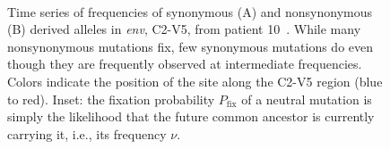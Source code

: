 \documentclass[rmp, twocolumn]{revtex4}
\newcommand{\pfix}{P_{\mathrm{fix}}}
\newcommand{\env}{\textit{env}}
\newcommand{\shankaregion}{C2-V5}
\begin{document}
\begin{figure}
\begin{center}
\\
\caption{Time series of frequencies
of synonymous (A) and nonsynonymous (B) derived alleles in \env, \shankaregion, from patient
10~\cite{shankarappa_consistent_1999}.
While many nonsynonymous mutations  fix, few synonymous
mutations do even though they are frequently observed at intermediate
frequencies. Colors indicate the position of the site along the \shankaregion{} region
(blue to red). Inset: the fixation probability $\pfix$ of a neutral
mutation is simply the likelihood that the future common ancestor is currently carrying
it, i.e., its frequency $\nu$.}
\label{fig:aft}
\end{center}
\end{figure}
\end{document}
